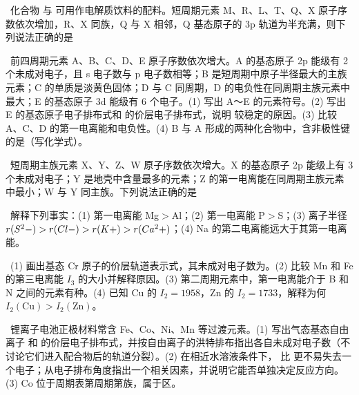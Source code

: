 \begin{xiti}
\item {}\ 化合物  与  可用作电解质饮料的配料。短周期元素 M、R、L、T、Q、X 原子序数依次增加，R、X 同族，Q 与 X 相邻，Q 基态原子的 3p 轨道为半充满，则下列说法正确的是\xz
{}

\item {}\ 前四周期元素 A、B、C、D、E 原子序数依次增大。A 的基态原子 2p 能级有 2 个未成对电子，且 s 电子数与 p 电子数相等；B 是短周期中原子半径最大的主族元素；C 的单质是淡黄色固体；D 与 C 同周期，D 的电负性在同周期主族元素中最大；E 的基态原子 3d 能级有 6 个电子。(1) 写出 A～E 的元素符号。(2) 写出 E 的基态原子电子排布式和  的价层电子排布式，说明  较稳定的原因。(3) 比较 A、C、D 的第一电离能和电负性。(4) B 与 A 形成的两种化合物中，含非极性键的是\tk（写化学式）。

\item {}\ 短周期主族元素 X、Y、Z、W 原子序数依次增大。X 的基态原子 2p 能级上有 3 个未成对电子；Y 是地壳中含量最多的元素；Z 的第一电离能在同周期主族元素中最小；W 与 Y 同主族。下列说法正确的是\xz
{}

\item {}\ 解释下列事实：(1) 第一电离能 Mg$>$Al；(2) 第一电离能 P$>$S；(3) 离子半径 $r(S^2-)>r(Cl-)>r(K+)>r(Ca^2+)$；(4) Na 的第二电离能远大于其第一电离能。
\end{xiti}

\begin{xiti}
\item {}\ (1) 画出基态 Cr 原子的价层轨道表示式，其未成对电子数为\tk。(2) 比较 Mn 和 Fe 的第三电离能 $I_3$ 的大小并解释原因。(3) 第二周期元素中，第一电离能介于 B 和 N 之间的元素有\tk{}种。(4) 已知 Cu 的 $I_2=1958$\kjmol{}，Zn 的 $I_2=1733$\kjmol{}，解释为何 $I_2(\text{Cu})>I_2(\text{Zn})$。

\item {}\ 锂离子电池正极材料常含 Fe、Co、Ni、Mn 等过渡元素。(1) 写出气态基态自由离子  和  的价层电子排布式，并按自由离子的洪特排布指出各自未成对电子数（不讨论它们进入配合物后的轨道分裂）。(2) 在相近水溶液条件下， 比  更不易失去一个电子；从电子排布角度指出一个相关因素，并说明它能否单独决定反应方向。(3) Co 位于周期表第\tk{}周期第\tk{}族，属于\tk{}区。
\end{xiti}

